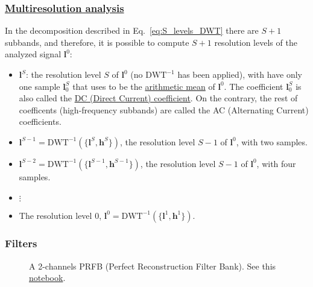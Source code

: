 \subsubsection{\href{https://en.wikipedia.org/wiki/Multiresolution_analysis}{Multiresolution analysis}}
In the decomposition described in Eq.~\ref{eq:S_levels_DWT} there are
$S+1$ subbands, and therefore, it is possible to compute $S+1$
resolution levels of the analyzed signal ${\mathbf l}^0$:
\begin{itemize}
\item  ${\mathbf l}^S$: the resolution level $S$ of ${\mathbf l}^0$ (no $\text{DWT}^{-1}$ has been
  applied), with have only one sample ${\mathbf l}^S_0$ that uses to be the
  \href{https://en.wikipedia.org/wiki/Arithmetic_mean}{arithmetic
    mean} of ${\mathbf l}^0$. The coefficient ${\mathbf l}^S_0$
  is also called the \href{https://en.wikipedia.org/wiki/DC_bias}{DC
    (Direct Current) coefficient}. On the contrary, the rest of
  coefficents (high-frequency subbands) are called the AC (Alternating
  Current) coefficients.
\item ${\mathbf l}^{S-1}=\text{DWT}^{-1}(\{{\mathbf l}^S, {\mathbf
  h}^S\})$, the resolution level $S-1$ of ${\mathbf l}^0$, with two
  samples.
\item ${\mathbf l}^{S-2}=\text{DWT}^{-1}(\{{\mathbf l}^{S-1}, {\mathbf
  h}^{S-1}\})$, the resolution level $S-1$ of ${\mathbf l}^0$, with
  four samples.
\item $\vdots$
\item The resolution level $0$, ${\mathbf
  l}^0=\text{DWT}^{-1}(\{{\mathbf l}^1, {\mathbf h}^1\})$.
\end{itemize}  

\subsubsection{Filters}

\begin{figure}
  \centering
  \caption{A 2-channels PRFB (Perfect Reconstruction Filter Bank). See
    this
    \href{https://github.com/Sistemas-Multimedia/Sistemas-Multimedia.github.io/blob/master/study_guide/07-DWT/PRFB.ipynb}{notebook}.}
  \label{fig:PRFB}
\end{figure}

